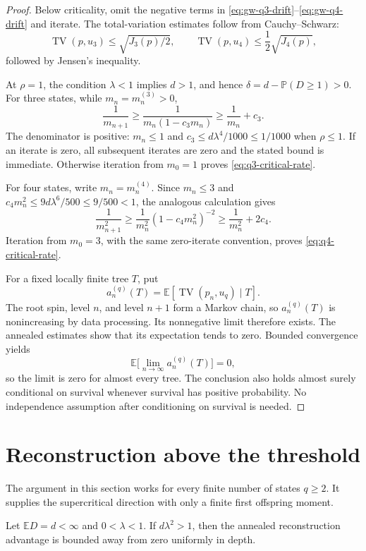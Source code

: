 \begin{proof}
Below criticality, omit the negative terms in
\eqref{eq:gw-q3-drift}--\eqref{eq:gw-q4-drift} and iterate.  The
total-variation estimates follow from Cauchy--Schwarz:
\[
 \operatorname{TV}(p,u_3)\le\sqrt{J_3(p)/2},\qquad
 \operatorname{TV}(p,u_4)\le\frac12\sqrt{J_4(p)},
\]
followed by Jensen's inequality.

At $\rho=1$, the condition $\lambda<1$ implies $d>1$, and hence
$\delta=d-\mathbb P(D\ge1)>0$.  For three states, while
$m_n=m_n^{(3)}>0$,
\[
 \frac1{m_{n+1}}
 \ge\frac1{m_n(1-c_3m_n)}
 \ge\frac1{m_n}+c_3.
\]
The denominator is positive: $m_n\le1$ and
$c_3\le d\lambda^4/1000\le1/1000$ when $\rho\le1$.
If an iterate is zero, all subsequent iterates are zero and the stated
bound is immediate.  Otherwise iteration from $m_0=1$ proves
\eqref{eq:q3-critical-rate}.

For four states, write $m_n=m_n^{(4)}$.  Since $m_n\le3$ and
$c_4m_n^2\le9d\lambda^6/500\le9/500<1$, the analogous calculation gives
\[
 \frac1{m_{n+1}^2}
 \ge\frac1{m_n^2}(1-c_4m_n^2)^{-2}
 \ge\frac1{m_n^2}+2c_4.
\]
Iteration from $m_0=3$, with the same zero-iterate convention, proves
\eqref{eq:q4-critical-rate}.

For a fixed locally finite tree $T$, put
\[
 a_n^{(q)}(T)=
 \mathbb E[\operatorname{TV}(p_n,u_q)\mid T].
\]
The root spin, level $n$, and level $n+1$ form a Markov chain, so
$a_n^{(q)}(T)$ is nonincreasing by data processing.  Its nonnegative limit
therefore exists.  The annealed estimates show that its expectation tends
to zero.  Bounded convergence yields
\[
 \mathbb{E}\bigl[\lim_{n\to\infty}a_n^{(q)}(T)\bigr]=0,
\]
so the limit is zero for almost every tree.  The conclusion also holds
almost surely conditional on survival whenever survival has positive
probability.  No independence assumption after conditioning on survival
is needed.
\end{proof}

\section{Reconstruction above the threshold}
\label{sec:finite-mean-supercritical}

The argument in this section works for every finite number of states
$q\ge2$.  It supplies the supercritical direction with only a finite first
offspring moment.

\begin{proposition}
\label{prop:bounded-pruning}
Let $\mathbb E D=d<\infty$ and $0<\lambda<1$.  If
$d\lambda^2>1$, then the annealed reconstruction advantage is bounded
away from zero uniformly in depth.
\end{proposition}

